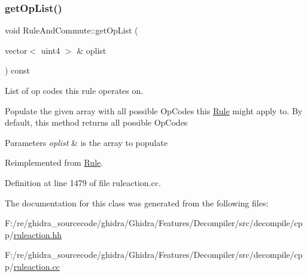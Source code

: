 \subsubsection{\texorpdfstring{getOpList()}{getOpList()}}
{\footnotesize\ttfamily void Rule\+And\+Commute\+::get\+Op\+List (\begin{DoxyParamCaption}\item[{vector$<$ uint4 $>$ \&}]{oplist }\end{DoxyParamCaption}) const\hspace{0.3cm}{\ttfamily [virtual]}}



List of op codes this rule operates on. 

Populate the given array with all possible Op\+Codes this \mbox{\hyperlink{class_rule}{Rule}} might apply to. By default, this method returns all possible Op\+Codes 
\begin{DoxyParams}{Parameters}
{\em oplist} & is the array to populate \\
\hline
\end{DoxyParams}


Reimplemented from \mbox{\hyperlink{class_rule_a4023bfc7825de0ab866790551856d10e}{Rule}}.



Definition at line 1479 of file ruleaction.\+cc.



The documentation for this class was generated from the following files\+:\begin{DoxyCompactItemize}
\item 
F\+:/re/ghidra\+\_\+sourcecode/ghidra/\+Ghidra/\+Features/\+Decompiler/src/decompile/cpp/\mbox{\hyperlink{ruleaction_8hh}{ruleaction.\+hh}}\item 
F\+:/re/ghidra\+\_\+sourcecode/ghidra/\+Ghidra/\+Features/\+Decompiler/src/decompile/cpp/\mbox{\hyperlink{ruleaction_8cc}{ruleaction.\+cc}}\end{DoxyCompactItemize}
